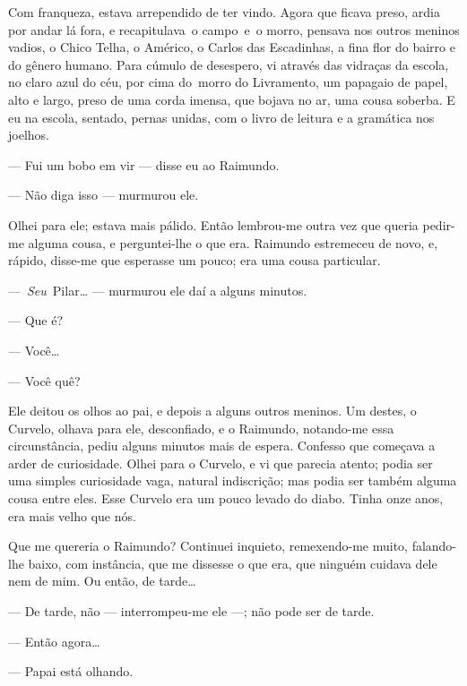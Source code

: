 Com franqueza, estava arrependido de ter vindo. Agora que ficava preso,
ardia por andar lá fora, e recapitulava~o campo~e~o morro, pensava nos
outros meninos vadios, o Chico Telha, o Américo, o Carlos das
Escadinhas, a fina flor do bairro e do gênero humano. Para cúmulo de
desespero, vi através das vidraças da escola, no claro azul do céu, por
cima do~morro do Livramento, um papagaio de papel, alto e largo, preso
de uma corda imensa, que bojava no ar, uma cousa soberba. E eu na
escola, sentado, pernas unidas, com o livro de leitura e a gramática nos
joelhos.

--- Fui um bobo em vir --- disse eu ao Raimundo.

--- Não diga isso --- murmurou ele.

Olhei para ele; estava mais pálido. Então lembrou-me outra vez que
queria pedir-me alguma cousa, e perguntei-lhe o que era. Raimundo
estremeceu de novo, e, rápido, disse-me que esperasse um pouco; era uma
cousa particular.

---~\emph{Seu}~Pilar\ldots{} --- murmurou ele daí a alguns minutos.

--- Que é?

--- Você\ldots{}

--- Você quê?

Ele deitou os olhos ao pai, e depois a alguns outros meninos. Um destes,
o Curvelo, olhava para ele, desconfiado, e o Raimundo, notando-me essa
circunstância, pediu alguns minutos mais de espera. Confesso que
começava a arder de curiosidade. Olhei para o Curvelo, e vi que parecia
atento; podia ser uma simples curiosidade vaga, natural indiscrição; mas
podia ser também alguma cousa entre eles. Esse Curvelo era um pouco
levado do diabo. Tinha onze anos, era mais velho que nós.

Que me quereria o Raimundo? Continuei inquieto, remexendo-me muito,
falando-lhe baixo, com instância, que me dissesse o que era, que ninguém
cuidava dele nem de mim. Ou então, de tarde\ldots{}

--- De tarde, não --- interrompeu-me ele ---; não pode ser de tarde.

--- Então agora\ldots{}

--- Papai está olhando.

